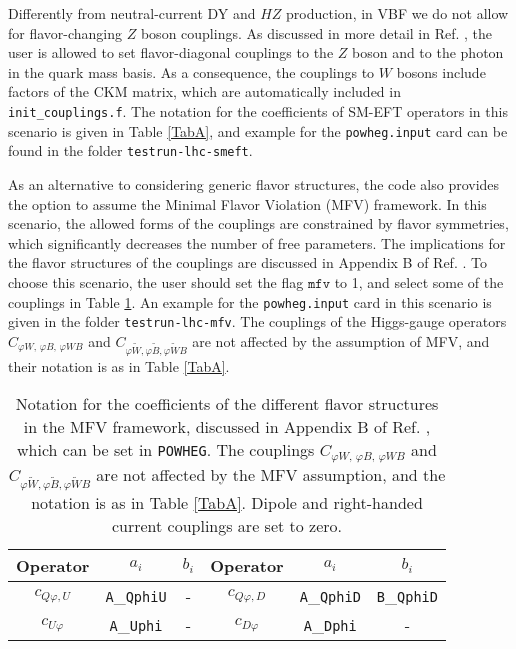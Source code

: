 \documentclass[paper]{JHEP3}
\begin{document}
Differently from neutral-current DY and $HZ$ production, in VBF we do not allow for flavor-changing $Z$ boson couplings. 
As discussed in more detail in Ref. \cite{Alioli:2018ljm}, the user is allowed to set flavor-diagonal couplings to the $Z$ boson and to the photon in the quark mass basis.
As a consequence, the couplings to $W$ bosons include factors of the CKM matrix, which are automatically included in \texttt{init\_couplings.f}. 
The notation for the coefficients of SM-EFT operators in this scenario is given in Table \ref{TabA}, and example for the \texttt{powheg.input}  card can be found in the folder \texttt{testrun-lhc-smeft}.


As an alternative to considering generic flavor structures, the code also provides the option to assume the Minimal Flavor Violation (MFV) framework. In this scenario, the allowed forms of the couplings are constrained by  flavor symmetries, which significantly decreases the number of free parameters. 
The implications for the flavor structures of the couplings are discussed in Appendix B of Ref. \cite{Alioli:2018ljm}.
To choose this scenario, the user should set the flag $\texttt{mfv}$ to 1, and select some of the couplings in Table \ref{tab:mfv}.
An example for the \texttt{powheg.input}  card in this scenario is given in the folder \texttt{testrun-lhc-mfv}. The couplings of the Higgs-gauge operators
$C_{\varphi W,\, \varphi B, \, \varphi W B}$ and $C_{\varphi \tilde{W},\varphi \tilde{B},\varphi \tilde{W} B}$ are not affected by the assumption of MFV, and their notation is as in Table
\ref{TabA}.


\begin{table}
\center
\begin{tabular}{||c|c  c|| c | c c || }
\hline
	Operator    & $a_i$ & $b_i$ & Operator & $a_i$ & $b_i$\\\hline
$	c_{Q\varphi,U}$ & \texttt{A}\_\texttt{QphiU} & - &
$	c_{Q\varphi,D}$ & \texttt{A}\_\texttt{QphiD} & \texttt{B}\_\texttt{QphiD}  \\
$	c_{U\varphi }$  & \texttt{A}\_\texttt{Uphi} &-&
$	c_{D\varphi }$  & \texttt{A}\_\texttt{Dphi}&- \\
\hline
\end{tabular}
\caption{Notation for the coefficients of the different flavor structures in the MFV framework, discussed in Appendix B of Ref. \cite{Alioli:2018ljm}, which can be set in \texttt{POWHEG}.
The couplings $C_{\varphi W,\, \varphi B, \, \varphi W B}$ and $C_{\varphi \tilde{W},\varphi \tilde{B},\varphi \tilde{W} B}$ are not affected by the MFV assumption, and the notation is as in Table 
\ref{TabA}. Dipole and right-handed current  couplings are set to zero.
}\label{tab:mfv}
\end{table}
\end{document}
